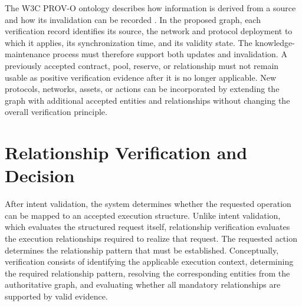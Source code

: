 The W3C PROV-O ontology describes how information is derived from a source
and how its invalidation can be recorded \cite{w3cPROVO2013}. In the
proposed graph, each verification record identifies its source, the network
and protocol deployment to which it applies, its synchronization time, and
its validity state. The knowledge-maintenance process must therefore support both updates and
invalidation. A previously accepted contract, pool, reserve, or relationship
must not remain usable as positive verification evidence after it is no longer
applicable. New protocols, networks, assets, or actions can be incorporated by
extending the graph with additional accepted entities and relationships without
changing the overall verification principle.



\section{Relationship Verification and Decision}
\label{sec:relationship_verification}

After intent validation, the system determines whether the requested operation
can be mapped to an accepted execution structure. Unlike intent validation,
which evaluates the structured request itself, relationship verification
evaluates the execution relationships required to realize that request. The requested action determines the relationship pattern that must be
established. Conceptually, verification consists of identifying the applicable
execution context, determining the required relationship pattern, resolving the
corresponding entities from the authoritative graph, and evaluating whether all
mandatory relationships are supported by valid evidence.




